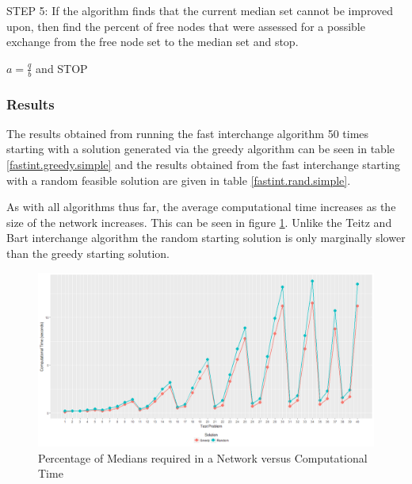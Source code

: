 \documentclass[11pt]{article}
\newcommand{\np}{\newpage}
\begin{document}
		\np
		\begin{algorithm}
			\begin{algorithmic}[0]
			\Statex
			\Statex STEP 5: If the algorithm finds that the current median set cannot be improved upon, then find the percent of free nodes that were assessed for a possible exchange from the free node set to the median set and stop.
			\begin{center}
				$a=\frac{q}{b}$ and STOP
			\end{center}
			
		\end{algorithmic}
	\end{algorithm}

	\subsubsection{Results}
	
	The results obtained from running the fast interchange algorithm 50 times starting with a solution generated via the greedy algorithm can be seen in table \ref{fastint.greedy.simple} and the results obtained from the fast interchange starting with a random feasible solution are given in table \ref{fastint.rand.simple}.
	
	As with all algorithms thus far, the average computational time increases as the size of the network increases.  This can be seen in figure \ref{FintTime}.  Unlike the Teitz and Bart interchange algorithm the random starting solution is only marginally slower than the greedy starting solution.
	
	\begin{figure}[H]
		\begin{center}
			\includegraphics[width=14cm]{FintTime.png}
			\caption{Percentage of Medians required in a Network versus Computational Time}
			\label{FintTime}
		\end{center}
	\end{figure}
	
\end{document}
